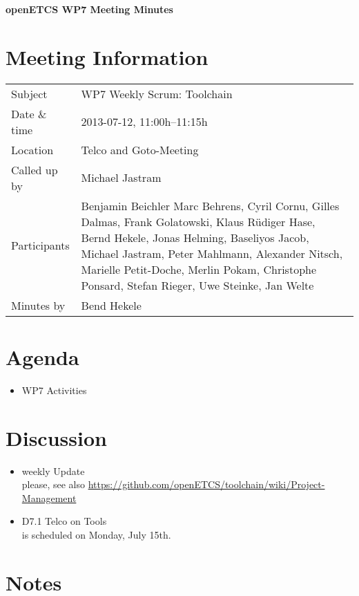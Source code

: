 \documentclass[a4paper, 11pt]{article}
\begin{document}
{\begin{center}\huge\bf openETCS WP7 Meeting Minutes\end{center}}
\section{Meeting Information}

\renewcommand{\arraystretch}{1.5}
\begin{supertabular}{m{.2\textwidth}m{.8\textwidth}}
Subject & WP7 Weekly Scrum: Toolchain\\
Date \& time & 2013-07-12, 11:00h--11:15h\\
Location & Telco and Goto-Meeting\\
Called up by & Michael Jastram\\
Participants &
Benjamin Beichler
Marc Behrens,
Cyril Cornu,
Gilles Dalmas,
Frank Golatowski,
Klaus R\"udiger Hase,
Bernd Hekele,
Jonas Helming,
Baseliyos Jacob,
Michael Jastram,
Peter Mahlmann,
Alexander Nitsch,
Marielle Petit-Doche,
Merlin Pokam,
Christophe Ponsard,
Stefan Rieger,
Uwe Steinke,
Jan Welte\\


Minutes by & Bend Hekele\\

\end{supertabular}
\renewcommand{\arraystretch}{1.0}


\section{Agenda}
\begin{itemize}
\item WP7 Activities
\end{itemize}

\section{Discussion}

\begin{itemize}
\item weekly Update\\
please, see also  \url{https://github.com/openETCS/toolchain/wiki/Project-Management}
\item D7.1 Telco on Tools\\
is scheduled on Monday, July 15th.

\end{itemize}

\section{Notes}
\end{document}
